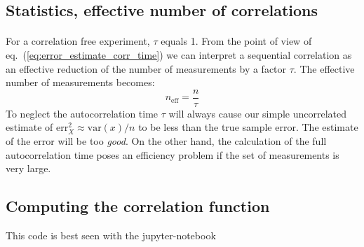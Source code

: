\documentclass[%
oneside,                 %
final,                   %
10pt]{article}
\begin{document}
\subsection*{Statistics, effective number of correlations}

\paragraph{}
For a correlation free experiment, $\tau$
equals 1. From the point of view of
eq.~(\ref{eq:error_estimate_corr_time}) we can interpret a sequential
correlation as an effective reduction of the number of measurements by
a factor $\tau$. The effective number of measurements becomes:
\[
n_\mathrm{eff} = \frac{n}{\tau}
\]
To neglect the autocorrelation time $\tau$ will always cause our
simple uncorrelated estimate of $\mathrm{err}_X^2\approx \mathrm{var}(x)/n$ to
be less than the true sample error. The estimate of the error will be
too \emph{good}. On the other hand, the calculation of the full
autocorrelation time poses an efficiency problem if the set of
measurements is very large.



\subsection*{Computing the correlation function}

This code is best seen with the jupyter-notebook
\end{document}
